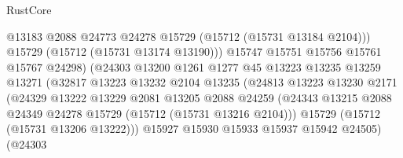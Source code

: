 \begin{lexlean}{RustCore}
\begin{coremodule}
                                        @13183
                                        @2088
                                        @24773
                                        @24278
                                        @15729
                                        (@15712 (@15731 @13184 @2104)))
                                      @15729
                                      (@15712 (@15731 @13174 @13190)))
                                    @15747
                                    @15751
                                    @15756
                                    @15761
                                    @15767
                                    @24298)
                                  (@24303
                                    @13200
                                    @1261
                                    @1277
                                    @45
                                    @13223
                                    @13235
                                    @13259
                                    @13271
                                    (@32817
                                      @13223
                                      @13232
                                      @2104
                                      @13235
                                      (@24813
                                        @13223
                                        @13230
                                        @2171
                                        (@24329
                                          @13222
                                          @13229
                                          @2081
                                          @13205
                                          @2088
                                          @24259
                                          (@24343
                                            @13215
                                            @2088
                                            @24349
                                            @24278
                                            @15729
                                            (@15712 (@15731 @13216 @2104)))
                                          @15729
                                          (@15712 (@15731 @13206 @13222)))
                                        @15927
                                        @15930
                                        @15933
                                        @15937
                                        @15942
                                        @24505)
                                      (@24303

\end{coremodule}
\end{lexlean}
